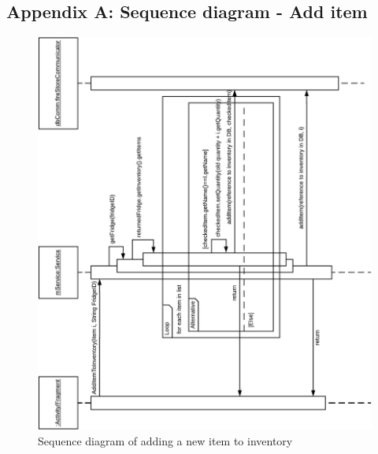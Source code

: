 \documentclass[12pt]{article}
\begin{document}
\subsection{Appendix A: Sequence diagram - Add item}
\begin{figure}[H]
	\centering
	\includegraphics[width=180mm]{Img/APPENDIX A - SD-ADD-ITEM.pdf}
	\caption{Sequence diagram of adding a new item to inventory}
	\label{fig:SD_addItem}
\end{figure}
\end{document}
